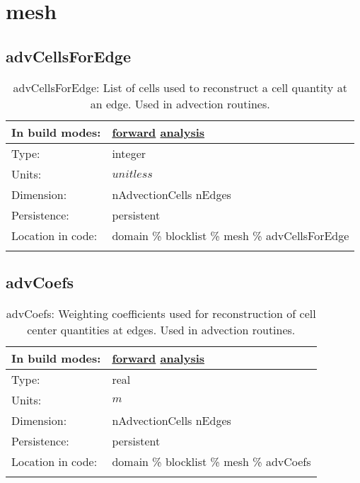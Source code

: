\section[mesh]{mesh}
\label{sec:var_sec_mesh}
\subsection[advCellsForEdge]{advCellsForEdge}
\label{subsec:var_sec_mesh_advCellsForEdge}
\begin{center}
\begin{longtable}{| p{2.0in} | p{4.0in} |}
        \hline 
        In build modes: & \hyperref[subsec:forward_var_tab_mesh]{forward} \hyperref[subsec:analysis_var_tab_mesh]{analysis} \\
        \hline 
        Type: & integer \\
        \hline 
        Units: & $unitless$ \\
        \hline 
        Dimension: & nAdvectionCells nEdges \\
        \hline 
        Persistence: & persistent \\
        \hline 
		 Location in code: & domain \% blocklist \% mesh \% advCellsForEdge \\
		 \hline 
    \caption{advCellsForEdge: List of cells used to reconstruct a cell quantity at an edge. Used in advection routines.}
\end{longtable}
\end{center}
\subsection[advCoefs]{advCoefs}
\label{subsec:var_sec_mesh_advCoefs}
\begin{center}
\begin{longtable}{| p{2.0in} | p{4.0in} |}
        \hline 
        In build modes: & \hyperref[subsec:forward_var_tab_mesh]{forward} \hyperref[subsec:analysis_var_tab_mesh]{analysis} \\
        \hline 
        Type: & real \\
        \hline 
        Units: & $m$ \\
        \hline 
        Dimension: & nAdvectionCells nEdges \\
        \hline 
        Persistence: & persistent \\
        \hline 
		 Location in code: & domain \% blocklist \% mesh \% advCoefs \\
		 \hline 
    \caption{advCoefs: Weighting coefficients used for reconstruction of cell center quantities at edges. Used in advection routines.}
\end{longtable}
\end{center}
